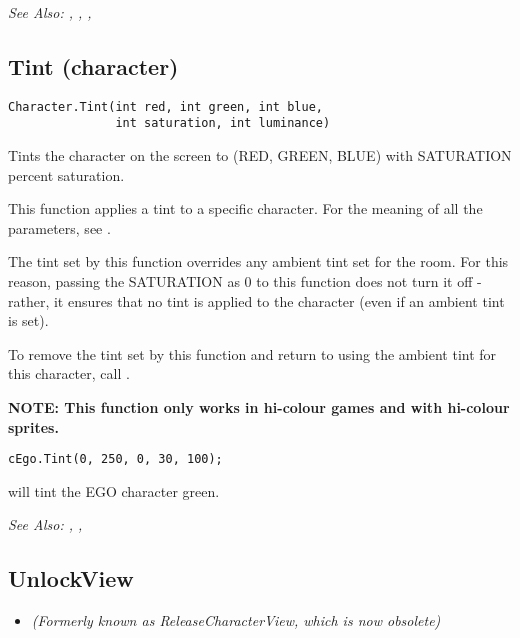 \it{See Also:} ,
,
,


\subsection{Tint (character)}\label{Character.Tint}%

\begin{verbatim}
Character.Tint(int red, int green, int blue,
               int saturation, int luminance)
\end{verbatim}

Tints the character on the screen to (RED, GREEN, BLUE) with SATURATION percent
saturation.

This function applies a tint to a specific character. For the meaning of all the parameters,
see .

The tint set by this function overrides any ambient tint set for the room. For this
reason, passing the SATURATION as 0 to this function does not turn it off - rather, it
ensures that no tint is applied to the character (even if an ambient tint is set).

To remove the tint set by this function and return to using the ambient tint for this
character, call .

\bf{NOTE:} This function only works in hi-colour games and with hi-colour sprites.

\begin{verbatim}
cEgo.Tint(0, 250, 0, 30, 100);
\end{verbatim}
will tint the EGO character green.

\it{See Also:} ,
,


\subsection{UnlockView}\label{Character.UnlockView}%

\begin{itemize}
\item \it{(Formerly known as ReleaseCharacterView, which is now obsolete)}
\end{itemize}

